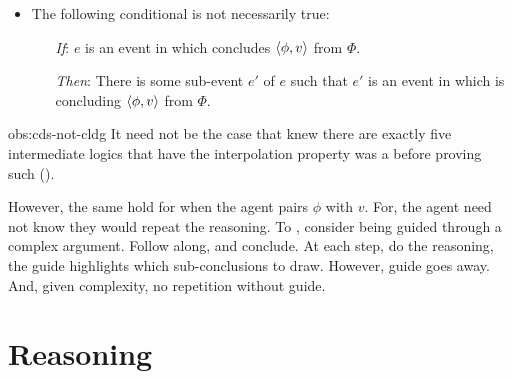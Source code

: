 \begin{note}
  \begin{observation}
    \label{obs:cds-not-cldg}

    \begin{itemize}
    \item
      The following conditional is not necessarily true:
      \begin{itemize}
      \item[\emph{If}:]
        \(e\) is an event in which \vAgent{} concludes \(\langle \phi, v \rangle\) from \(\Phi\).
      \item[\emph{Then}:]
        There is some sub-event \(e'\) of \(e\) such that \(e'\) is an event in which \vAgent{} is concluding \(\langle \phi, v \rangle\) from \(\Phi\).
      \end{itemize}
    \end{itemize}
  \end{observation}

  \begin{argument}{obs:cds-not-cldg}
    It need not be the case that \citeauthor{Maksimova:1977un} knew there are exactly five intermediate logics that have the interpolation property was a \fc{} before proving such (\cite[cf.][]{Maksimova:1977un}).

    However, the same hold for when the agent pairs \(\phi\) with \(v\).
    For, the agent need not know they would repeat the reasoning.
    To , consider being guided through a complex argument.
    Follow along, and conclude.
    At each step, do the reasoning, the guide highlights which sub-conclusions to draw.
    However, guide goes away.
    And, given complexity, no repetition without guide.
  \end{argument}
\end{note}

\section{Reasoning}
\label{sec:reasoning-1}

